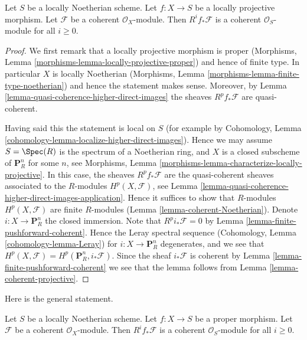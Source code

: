 \begin{lemma}
\label{lemma-locally-projective-pushforward}
Let $S$ be a locally Noetherian scheme.
Let $f : X \to S$ be a locally projective morphism.
Let $\mathcal{F}$ be a coherent $\mathcal{O}_X$-module.
Then $R^if_*\mathcal{F}$ is a coherent $\mathcal{O}_S$-module
for all $i \geq 0$.
\end{lemma}

\begin{proof}
We first remark that a locally projective morphism is proper
(Morphisms, Lemma \ref{morphisms-lemma-locally-projective-proper})
and hence of finite type.
In particular $X$ is locally Noetherian
(Morphisms, Lemma \ref{morphisms-lemma-finite-type-noetherian})
and hence the statement makes sense.
Moreover, by Lemma \ref{lemma-quasi-coherence-higher-direct-images}
the sheaves $R^pf_*\mathcal{F}$ are quasi-coherent.

\medskip\noindent
Having said this the statement is local on $S$ (for example by
Cohomology, Lemma \ref{cohomology-lemma-localize-higher-direct-images}).
Hence we may assume $S = \Spec(R)$ is the spectrum of
a Noetherian ring, and $X$ is a closed subscheme of
$\mathbf{P}^n_R$ for some $n$, see
Morphisms, Lemma \ref{morphisms-lemma-characterize-locally-projective}.
In this case, the sheaves $R^pf_*\mathcal{F}$ are the quasi-coherent
sheaves associated to the $R$-modules $H^p(X, \mathcal{F})$, see
Lemma \ref{lemma-quasi-coherence-higher-direct-images-application}.
Hence it suffices to show that $R$-modules $H^p(X, \mathcal{F})$
are finite $R$-modules (Lemma \ref{lemma-coherent-Noetherian}).
Denote $i : X \to \mathbf{P}^n_R$ the closed immersion.
Note that $R^pi_*\mathcal{F} = 0$ by
Lemma \ref{lemma-finite-pushforward-coherent}.
Hence the Leray spectral sequence
(Cohomology, Lemma \ref{cohomology-lemma-Leray})
for $i : X \to \mathbf{P}^n_R$ degenerates, and we see that
$H^p(X, \mathcal{F}) = H^p(\mathbf{P}^n_R, i_*\mathcal{F})$.
Since the sheaf $i_*\mathcal{F}$ is coherent by
Lemma \ref{lemma-finite-pushforward-coherent}
we see that the lemma follows from Lemma \ref{lemma-coherent-projective}.
\end{proof}

\noindent
Here is the general statement.

\begin{lemma}
\label{lemma-proper-pushforward-coherent}
Let $S$ be a locally Noetherian scheme.
Let $f : X \to S$ be a proper morphism.
Let $\mathcal{F}$ be a coherent $\mathcal{O}_X$-module.
Then $R^if_*\mathcal{F}$ is a coherent $\mathcal{O}_S$-module
for all $i \geq 0$.
\end{lemma}


